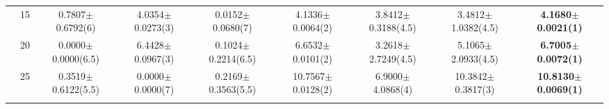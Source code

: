 \begin{table*}[htbp]
\begin{adjustbox}{width=1.0\textwidth,center}
\begin{tabular}{ccccccccc}
      & 15         & 0.7807$\pm$0.6792(6)   & 4.0354$\pm$0.0273(3)            & 0.0152$\pm$0.0680(7)   & 4.1336$\pm$0.0064(2)             & 3.8412$\pm$0.3188(4.5)          & 3.4812$\pm$1.0382(4.5)          & \textbf{4.1680$\pm$0.0021(1)}   \\
      & 20         & 0.0000$\pm$0.0000(6.5) & 6.4428$\pm$0.0967(3)            & 0.1024$\pm$0.2214(6.5) & 6.6532$\pm$0.0101(2)             & 3.2618$\pm$2.7249(4.5)          & 5.1065$\pm$2.0933(4.5)          & \textbf{6.7005$\pm$0.0072(1)}   \\
      & 25         & 0.3519$\pm$0.6122(5.5) & 0.0000$\pm$0.0000(7)            & 0.2169$\pm$0.3563(5.5) & 10.7567$\pm$0.0128(2)            & 6.9000$\pm$4.0868(4)            & 10.3842$\pm$0.3817(3)           & \textbf{10.8130$\pm$0.0069(1)}  \\\thickhline

\end{tabular}
\end{adjustbox}
\end{table*}
